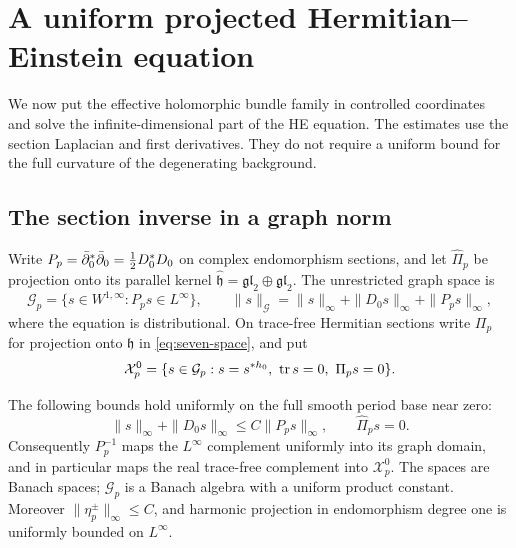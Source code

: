 \section{A uniform projected Hermitian--Einstein equation}
\label{sec:projected-he}

We now put the effective holomorphic bundle family in controlled
coordinates and solve the infinite-dimensional part of the HE
equation. The estimates use the section Laplacian and first
derivatives. They do not require a uniform bound for the full
curvature of the degenerating background.

\subsection{The section inverse in a graph norm}

Write $P_p=\bar\partial_0^*\bar\partial_0=\tfrac12D_0^*D_0$ on complex
endomorphism sections, and let $\widehat\Pi_p$ be projection
onto its parallel kernel $\widehat{\mathfrak h}
=\mathfrak{gl}_2\oplus\mathfrak{gl}_2$.
The unrestricted graph space is
\[
 \mathcal G_p=\{s\in W^{1,\infty}:P_ps\in L^\infty\},
 \qquad
 \|s\|_{\mathcal G}=\|s\|_\infty+\|D_0s\|_\infty+\|P_ps\|_\infty,
\]
where the equation is distributional. On trace-free Hermitian
sections write $\Pi_p$ for projection onto
$\mathfrak h$ in \eqref{eq:seven-space}, and put
\begin{equation}\label{eq:real-graph-space}
 \mathcal X_p^0=\{s\in\mathcal G_p:s=s^{*h_0},\ \operatorname{tr} s=0,
                                          \ \Pi_ps=0\}.
\end{equation}

\begin{lemma}\label{lem:graph-inverse}
The following bounds hold uniformly on the full smooth period
base near zero:
\begin{equation}\label{eq:graph-inverse}
 \|s\|_\infty+\|D_0s\|_\infty
                        \le C\|P_ps\|_\infty,
                  \qquad\widehat\Pi_ps=0.
\end{equation}
Consequently $P_p^{-1}$ maps the $L^\infty$ complement uniformly
into its graph domain, and in particular maps the real
trace-free complement into $\mathcal X_p^0$.
The spaces are Banach spaces; $\mathcal G_p$ is a Banach algebra
with a uniform product constant. Moreover
$\|\eta_p^\pm\|_\infty\le C$, and harmonic projection in
endomorphism degree one is uniformly bounded on $L^\infty$.
\end{lemma}

